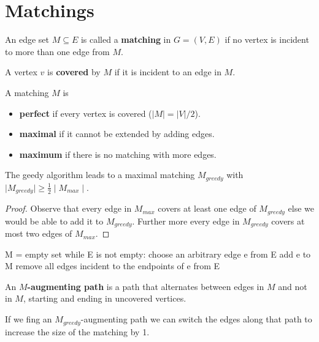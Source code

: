 \section{Matchings}

\begin{definition}
	An edge set $M \subseteq E$ is called a \textbf{matching} in $G = (V, E)$ if no vertex is incident to more than one edge from $M$.
\end{definition}

\begin{definition}
	A vertex $v$ is \textbf{covered} by $M$ if it is incident to an edge in $M$.
\end{definition}

\begin{definition}
	A matching $M$ is
	\begin{itemize}
		\item \textbf{perfect} if every vertex is covered ($|M| = |V|/2$).
		\item \textbf{maximal} if it cannot be extended by adding edges.
		\item \textbf{maximum} if there is no matching with more edges.
	\end{itemize}
\end{definition}

\begin{theorem}
	The geedy algorithm leads to a maximal matching $M_{greedy}$ with $\mid M_{greedy} \mid \geq \frac{1}{2} \mid M_{max} \mid$.
\end{theorem}

\begin{proof}
	Observe that every edge in $M_{max}$ covers at least one edge of $M_{greedy}$ else we would be able to add it to $M_{greedy}$. Further more every edge in $M_{greedy}$ covers at most two edges of $M_{max}$.
\end{proof}

\begin{algorithm}
	M = empty set
	while E is not empty:
	choose an arbitrary edge e from E
	add e to M
	remove all edges incident to the endpoints of e from E
\end{algorithm}

\begin{definition}
	An \textbf{$M$-augmenting path} is a path that alternates between edges in $M$ and not in $M$, starting and ending in uncovered vertices.
\end{definition}

\begin{remark}
	If we fing an $M_{greedy}$-augmenting path we can switch the edges along that path to increase the size of the matching by 1.
\end{remark}

